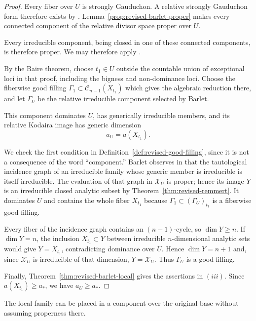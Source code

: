 \documentclass[11pt]{amsart}
\numberwithin{equation}{section}
\theoremstyle{plain}
\theoremstyle{definition}
\newcommand{\cC}{\mathcal C}
\newcommand{\cX}{\mathcal X}
\begin{document}
\begin{proof}
Every fiber over $U$ is strongly Gauduchon.  A relative strongly
Gauduchon form therefore exists by
\cite[Lemma~3.0.7 and the following remark]{Ba15}.
Lemma~\ref{prop:revised-barlet-proper} makes every connected component of the
relative divisor space proper over $U$.

Every irreducible component, being closed in one of these connected
components, is therefore proper.  We may therefore apply
\cite[Proposition~4.0.8 and its proof]{Ba15}.

By the Baire theorem, choose $t_1\in U$ outside the countable union of
exceptional loci in that proof, including the bigness and non-dominance
loci.  Choose the fiberwise good filling
$\Gamma_1\subset\cC_{n-1}(X_{t_1})$ which gives the algebraic reduction
there, and let $\Gamma_U$ be the relative irreducible component selected
by Barlet.

This component dominates $U$, has generically irreducible members, and its
relative Kodaira image has generic dimension
\[
 a_U=a(X_{t_1}).
\]

We check the first condition in Definition~\ref{def:revised-good-filling}, since
it is not a consequence of the word ``component.''  Barlet observes in
\cite[\S~2.2]{Ba15} that
the tautological incidence graph of an irreducible family whose generic
member is irreducible is itself irreducible.  The evaluation of that graph in $\cX_U$ is
proper; hence its image $Y$ is an irreducible closed analytic subset by
Theorem~\ref{thm:revised-remmert}.  It dominates $U$ and contains the whole fiber
$X_{t_1}$ because $\Gamma_1\subset(\Gamma_U)_{t_1}$ is a fiberwise good
filling.

Every fiber of the incidence graph contains an $(n-1)$-cycle, so
$\dim Y\ge n$.  If $\dim Y=n$, the inclusion $X_{t_1}\subset Y$ between
irreducible $n$-dimensional analytic sets would give $Y=X_{t_1}$,
contradicting dominance over $U$.  Hence $\dim Y=n+1$ and, since $\cX_U$ is
irreducible of that dimension, $Y=\cX_U$.  Thus $\Gamma_U$ is a good
filling.

Finally, Theorem~\ref{thm:revised-barlet-local} gives the assertions in $(iii)$.
Since $a(X_{t_1})\ge a_*$, we have $a_U\ge a_*$.
\end{proof}

The local family can be placed in a component over the original base
without assuming properness there.
\end{document}
